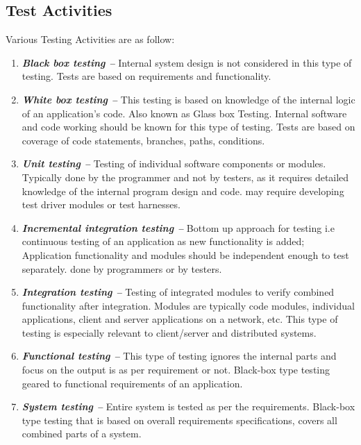 \subsection{Test Activities}
Various Testing Activities are as follow:
\begin{enumerate}
\item \textbf{\emph{Black box testing –}} Internal system design is not considered in this type of testing. Tests are based on requirements and functionality.

\item \textbf{\emph{White box testing –}} This testing is based on knowledge of the internal logic of an application’s code. Also known as Glass box Testing. Internal software and code working should be known for this type of testing. Tests are based on coverage of code statements, branches, paths, conditions.

\item \textbf{\emph{Unit testing –}} Testing of individual software components or modules. Typically done by the programmer and not by testers, as it requires detailed knowledge of the internal program design and code. may require developing test driver modules or test harnesses.

\item \textbf{\emph{Incremental integration testing –}} Bottom up approach for testing i.e continuous testing of an application as new functionality is added; Application functionality and modules should be independent enough to test separately. done by programmers or by testers.

\item \textbf{\emph{Integration testing –}} Testing of integrated modules to verify combined functionality after integration. Modules are typically code modules, individual applications, client and server applications on a network, etc. This type of testing is especially relevant to client/server and distributed systems.

\item \textbf{\emph{Functional testing –}} This type of testing ignores the internal parts and focus on the output is as per requirement or not. Black-box type testing geared to functional requirements of an application.

\item \textbf{\emph{System testing –}} Entire system is tested as per the requirements. Black-box type testing that is based on overall requirements specifications, covers all combined parts of a system.


\end{enumerate}
